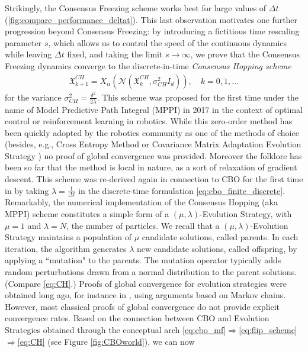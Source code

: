 \documentclass[reqno]{amsart}
\numberwithin{algorithm}{section}
\newcommand{\Xf}{{\mathfrak{X}}}
\begin{document}
{Strikingly, the Consensus Freezing scheme works best for large values of $\Delta t$ (\cref{fig:compare_performance_deltat}). This last observation motivates one further progression beyond Consensus Freezing: by introducing a fictitious time rescaling parameter  $s$, which allows us to control the speed of the continuous dynamics while leaving $\Delta t$ fixed, and taking the limit $s \to \infty$, we prove that the Consensus Freezing dynamics converge to the discrete-in-time \emph{Consensus Hopping scheme}
\begin{align}
\tag{CH}\label{eq:CH}
\Xf_{k+1}^{CH} =  X_{\alpha}( \mathcal N(\Xf_{k}^{CH}, \sigma_{CH}^2 I_d)), \quad k=0,1,\dots
\end{align}
for the variance $\sigma_{CH}^2=\frac{\delta^2}{2\lambda}$.
This scheme was proposed for the first time under the name of Model Predictive Path Integral (MPPI) in 2017 \cite{MPPI} in the context of optimal control or reinforcement learning in robotics. While this zero-order method has been quickly adopted by the robotics community as one of the methods of choice (besides, e.g., Cross Entropy Method or Covariance Matrix Adaptation Evolution Strategy \cite{sun2026CBOrob}) no proof of global convergence was provided. Moreover the folklore has been so far that the method is local in nature, as a sort of relaxation of gradient descent.
This scheme was re-derived again in connection to CBO for the first time in \cite{riedl_gradient_2023} by taking $\lambda=\frac{1}{\Delta t}$ in the discrete-time formulation \eqref{eq:cbo_finite_discrete}.
Remarkably, the numerical implementation of the Consensus Hopping (aka MPPI) scheme constitutes a simple form of a $(\mu, \lambda)$-Evolution Strategy, with $\mu=1$ and $\lambda=N$, the number of particles. We recall that a $(\mu,\lambda)$-Evolution Strategy \cite{AugerHansen2005} maintains a population of $\mu$ candidate solutions, called parents. In each iteration, the algorithm generates $\lambda$ new candidate solutions, called offspring, by applying a  ``mutation" to the parents. The mutation operator typically adds random perturbations drawn from a normal distribution to the parent solutions. (Compare \eqref{eq:CH}.) Proofs of global convergence for evolution strategies were obtained long ago, for instance in \cite{Rudolph1997,Rudolph1998}, using arguments based on Markov chains. However, most classical proofs of global convergence  do not provide explicit convergence rates. Based on the connection between CBO and Evolution Strategies obtained through the conceptual arch \eqref{eq:cbo_mf}$\Rightarrow$\eqref{eq:flip_scheme} $\Rightarrow$\eqref{eq:CH} (see Figure \ref{fig:CBOworld}), we can now 
}
\end{document}
